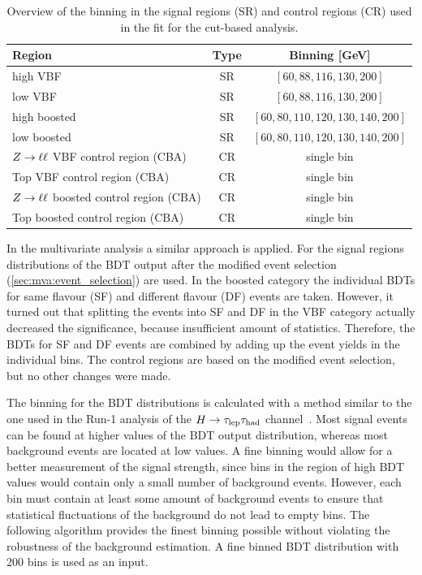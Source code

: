 \begin{table}[htpb]
    \centering
    \caption{Overview of the binning in the signal regions (SR) and control regions (CR) used in the fit for the cut-based analysis.}\label{tab:fit:regions:cba}
    \begin{tabular}{lcc}
        \toprule
        Region                              & Type  & Binning [GeV] \\ \midrule
        high VBF                            & SR    & $\left[60, 88, 116, 130, 200\right]$ \\
        low VBF                             & SR    & $\left[60, 88, 116, 130, 200\right]$ \\
        high boosted                        & SR    & $\left[60, 80, 110, 120, 130, 140, 200\right]$ \\
        low boosted                         & SR    & $\left[60, 80, 110, 120, 130, 140, 200\right]$ \\
        $Z \to \ell \ell$ VBF control region (CBA)     & CR    & single bin\\
        Top VBF control region (CBA)        & CR    & single bin\\
        $Z \to \ell \ell$ boosted control region (CBA) & CR    & single bin\\
        Top boosted control region (CBA)    & CR    & single bin\\
    \end{tabular}
\end{table}

In the multivariate analysis a similar approach is applied.
For the signal regions distributions of the BDT output after the modified event selection (\cref{sec:mva:event_selection}) are used.
In the boosted category the individual BDTs for same flavour (SF) and different flavour (DF) events are taken.
However, it turned out that splitting the events into SF and DF in the VBF category actually decreased the significance, because
insufficient amount of statistics.
Therefore, the BDTs for SF and DF events are combined by adding up the event yields in the individual bins.
The control regions are based on the modified event selection, but no other changes were made.

The binning for the BDT distributions is calculated with a method similar to the one used
in the Run-1 analysis of the $H \to \tau_\text{lep} \tau_\text{had}$ channel~\cite{RuthmannPhd}.
Most signal events can be found at higher values of the BDT output distribution, whereas most background events
are located at low values.
A fine binning would allow for a better measurement of the signal strength, since bins in the region of high BDT values
would contain only a small number of background events.
However, each bin must contain at least some amount of background events to ensure that statistical fluctuations of the
background do not lead to empty bins.
The following algorithm provides the finest binning possible without violating the robustness of the background estimation.
A fine binned BDT distribution with 200 bins is used as an input.


